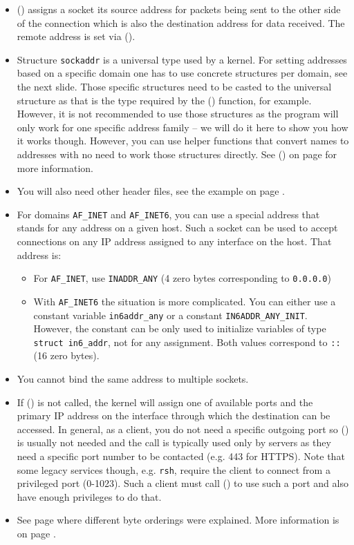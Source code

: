 \begin{itemize}
\item {}() assigns a socket its source address for packets being sent
to the other side of the connection which is also the destination address for
data received.  The remote address is set via ().

\item Structure \texttt{sockaddr} is a universal type used by a kernel.  For
setting addresses based on a specific domain one has to use concrete structures
per domain, see the next slide.  Those specific structures need to be casted to
the universal structure as that is the type required by the ()
function, for example.  However, it is not recommended to use those structures
as the program will only work for one specific address family -- we will do it
here to show you how it works though.  However, you can use helper functions
that convert names to addresses with no need to work those structures directly.
See () on page \pageref{GETADDRINF} for more information.
\item You will also need other header files, see the example on page
\pageref{BIND_EXAMPLE}.
\item For domains \texttt{AF\_INET} and \texttt{AF\_INET6}, you can use a
special address that stands for any address on a given host.  Such a socket can
be used to accept connections on any IP address assigned to any interface on the
host.  That address is:
\begin{itemize}
\item For \texttt{AF\_INET}, use \texttt{INADDR\_ANY} (4 zero
bytes corresponding to \texttt{0.0.0.0})
\item With \texttt{AF\_INET6} the situation is more complicated.  You can either
use a constant variable \texttt{in6addr\_any} or a constant
\texttt{IN6ADDR\_ANY\_INIT}.  How\-ever, the constant can be only used to
initialize variables of type \texttt{struct in6\_addr}, not for any assignment.
Both values correspond to \texttt{::} (16 zero bytes).
\end{itemize}
\item You cannot bind the same address to multiple sockets.

\item If () is not called, the kernel will assign one of available
ports and the primary IP address on the interface through which the destination
can be accessed.  In general, as a client, you do not need a specific outgoing
port so () is usually not needed and the call is typically used only
by servers as they need a specific port number to be contacted (e.g. 443 for
HTTPS).  Note that some legacy services though, e.g. \texttt{rsh}, require the
client to connect from a privileged port (0-1023).  Such a client must call
() to use such a port and also have enough privileges to do that.
\item {} See
page \pageref{BYTE_ORDERING} where different byte orderings were explained.
More information is on page \pageref{HTON}.
\end{itemize}

